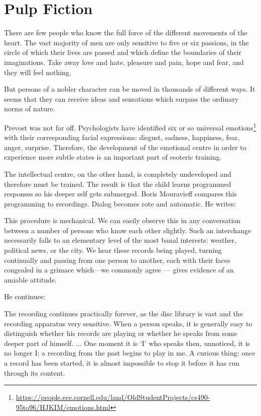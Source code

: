 \section{Pulp Fiction}

\begin{quotex}
There are few people who know the full force of the different movements of the heart. The vast majority of men are only sensitive to five or six passions, in the circle of which their lives are passed and which define the boundaries of their imaginations. Take away love and hate, pleasure and pain, hope and fear, and they will feel nothing.

But persons of a nobler character can be moved in thousands of different ways. It seems that they can receive ideas and sensations which surpass the ordinary norms of nature.
\end{quotex}


Prevost was not far off. Psychologists have identified six or so universal emotions\footnote{\url{https://people.ece.cornell.edu/land/OldStudentProjects/cs490-95to96/HJKIM/emotions.html}} with their corresponding facial expressions: disgust, sadness, happiness, fear, anger, surprise. Therefore, the development of the emotional centre in order to experience more subtle states is an important part of esoteric training.

The intellectual centre, on the other hand, is completely undeveloped and therefore must be trained. The result is that the child learns programmed responses so his deeper self gets submerged. Boris Mouravieff compares this programming to recordings. Dialog becomes rote and automatic. He writes:

\begin{quotex}
This procedure is mechanical. We can easily observe this in any conversation between a number of persons who know each other slightly. Such an interchange necessarily falls to an elementary level of the most banal interests: weather, political news, or the city. We hear these records being played, turning continually and passing from one person to another, each with their faces congealed in a grimace which---we commonly agree --- gives evidence of an amiable attitude.
\end{quotex}


He continues:

\begin{quotex}
The recording continues practically forever, as the disc library is vast and the recording apparatus very sensitive. When a person speaks, it is generally easy to distinguish whether his records are playing or whether he speaks from some deeper part of himself. ... One moment it is `I' who speaks then, unnoticed, it is no longer I; a recording from the past begins to play in me. A curious thing: once a record has been started, it is almost impossible to stop it before it has run through its content.
\end{quotex}


